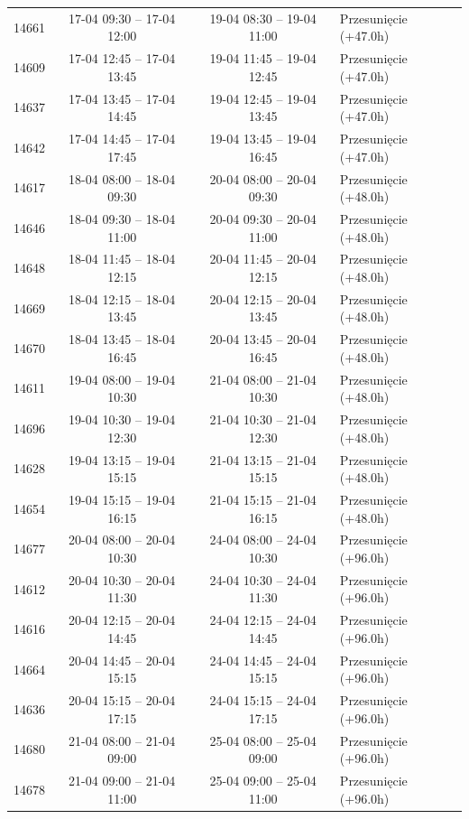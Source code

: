 \begin{table}[htbp]
\begin{tabular}{|r|c|c|l|}
14661 & 17-04 09:30 -- 17-04 12:00 & 19-04 08:30 -- 19-04 11:00 & Przesunięcie (+47.0h) \\ 
14609 & 17-04 12:45 -- 17-04 13:45 & 19-04 11:45 -- 19-04 12:45 & Przesunięcie (+47.0h) \\ 
14637 & 17-04 13:45 -- 17-04 14:45 & 19-04 12:45 -- 19-04 13:45 & Przesunięcie (+47.0h) \\ 
14642 & 17-04 14:45 -- 17-04 17:45 & 19-04 13:45 -- 19-04 16:45 & Przesunięcie (+47.0h) \\ 
14617 & 18-04 08:00 -- 18-04 09:30 & 20-04 08:00 -- 20-04 09:30 & Przesunięcie (+48.0h) \\ 
14646 & 18-04 09:30 -- 18-04 11:00 & 20-04 09:30 -- 20-04 11:00 & Przesunięcie (+48.0h) \\ 
14648 & 18-04 11:45 -- 18-04 12:15 & 20-04 11:45 -- 20-04 12:15 & Przesunięcie (+48.0h) \\ 
14669 & 18-04 12:15 -- 18-04 13:45 & 20-04 12:15 -- 20-04 13:45 & Przesunięcie (+48.0h) \\ 
14670 & 18-04 13:45 -- 18-04 16:45 & 20-04 13:45 -- 20-04 16:45 & Przesunięcie (+48.0h) \\ 
14611 & 19-04 08:00 -- 19-04 10:30 & 21-04 08:00 -- 21-04 10:30 & Przesunięcie (+48.0h) \\ 
14696 & 19-04 10:30 -- 19-04 12:30 & 21-04 10:30 -- 21-04 12:30 & Przesunięcie (+48.0h) \\ 
14628 & 19-04 13:15 -- 19-04 15:15 & 21-04 13:15 -- 21-04 15:15 & Przesunięcie (+48.0h) \\ 
14654 & 19-04 15:15 -- 19-04 16:15 & 21-04 15:15 -- 21-04 16:15 & Przesunięcie (+48.0h) \\ 
14677 & 20-04 08:00 -- 20-04 10:30 & 24-04 08:00 -- 24-04 10:30 & Przesunięcie (+96.0h) \\ 
14612 & 20-04 10:30 -- 20-04 11:30 & 24-04 10:30 -- 24-04 11:30 & Przesunięcie (+96.0h) \\ 
14616 & 20-04 12:15 -- 20-04 14:45 & 24-04 12:15 -- 24-04 14:45 & Przesunięcie (+96.0h) \\ 
14664 & 20-04 14:45 -- 20-04 15:15 & 24-04 14:45 -- 24-04 15:15 & Przesunięcie (+96.0h) \\ 
14636 & 20-04 15:15 -- 20-04 17:15 & 24-04 15:15 -- 24-04 17:15 & Przesunięcie (+96.0h) \\ 
14680 & 21-04 08:00 -- 21-04 09:00 & 25-04 08:00 -- 25-04 09:00 & Przesunięcie (+96.0h) \\ 
14678 & 21-04 09:00 -- 21-04 11:00 & 25-04 09:00 -- 25-04 11:00 & Przesunięcie (+96.0h) \\ 

\end{tabular}
\end{table}
